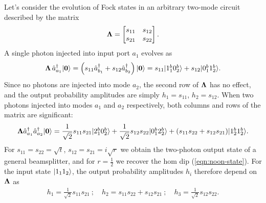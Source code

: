 Let's consider the evolution of Fock states in an arbitrary two-mode circuit described by the matrix
\begin{equation}
    \mathbf{\Lambda}=
   \begin{bmatrix}
   s_{11} & s_{12} \\ 
   s_{21} & s_{22} 
   \end{bmatrix} 
   .
\end{equation}
A single photon injected into input port $a_1$ evolves as 
\begin{equation}
    \mathbf{\Lambda} \,
    \hat{a}^{\dagger}_{a_1}
    \mbox{$ | \mathbf{0} \rangle $} 
    = \left(s_{11} \hat{a}^{\dagger}_{b_1} + s_{12} \hat{a}^{\dagger}_{b_2}\right) \mbox{$ | \mathbf{0} \rangle $}
    = s_{11}\mbox{$ | 1^b_1 0^b_2 \rangle $} + s_{12}\mbox{$ | 0^b_1 1^b_2 \rangle $}.
\end{equation}
Since no photons are injected into mode $a_2$, the second row of $\mathbf{\Lambda}$ has no effect, and the output probability amplitudes are simply $h_1=s_{11}$, $h_2=s_{12}$.  
%
When two photons injected into modes $a_1$ and $a_2$ respectively, both columns and rows of the matrix are significant:
\begin{gather}
    \mathbf{\Lambda}
    \hat{a}^{\dagger}_{a_1} \hat{a}^{\dagger}_{a_2} \mbox{$ | \mathbf{0} \rangle $} 
     = \frac{1}{\sqrt{2}} s_{11}s_{21} \mbox{$ | 2_1^b 0_2^b \rangle $}
     + \frac{1}{\sqrt{2}} s_{12}s_{22} \mbox{$ | 0_1^b 2_2^b \rangle $}
     + (s_{11}s_{22} + s_{12}s_{21}) \mbox{$ | 1_2^b1_2^b \rangle $} .
\end{gather}
For $s_{11}=s_{22}=\sqrt{t}$, $s_{12}=s_{21}=i\sqrt{r}$ we obtain the two-photon output state of a general beamsplitter, and for $r=\frac{1}{2}$ we recover the \gls{hom} dip (\ref{eqn:noon-state}). For the input state $\mbox{$ | 1_11_2 \rangle $}$, the output probability amplitudes $h_i$ therefore depend on $\mathbf{\Lambda}$ as
\begin{gather*}
    h_1 =  \frac{1}{\sqrt{2}} s_{11}s_{21}~;\quad
    h_2 =  s_{11}s_{22} + s_{12}s_{21}~;\quad
    h_3 =  \frac{1}{\sqrt{2}} s_{12}s_{22}.
\end{gather*}
